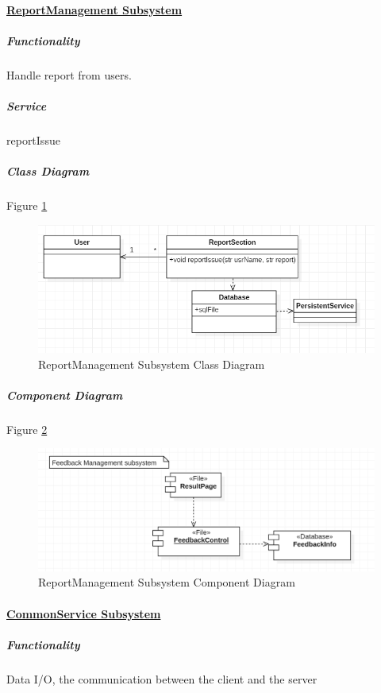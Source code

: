 \documentclass[10pt]{article}
\begin{document}
\paragraph{\underline{ReportManagement Subsystem}}
\subparagraph{Functionality} Handle report from users.

\subparagraph{Service}  reportIssue

\subparagraph{Class Diagram} Figure \ref{ReportManagement Subsystem Class Diagram}

\begin{figure}[H]
	\centering
	
	\includegraphics[width=14cm]{reportclass.png}
	\caption{ReportManagement Subsystem Class Diagram}
	\label{ReportManagement Subsystem Class Diagram}
\end{figure}

\subparagraph{Component Diagram} Figure \ref{ReportManagement Subsystem Component Diagram}

\begin{figure}[H]
	\centering
	
	\includegraphics[width=14cm]{reportcom.png}
	\caption{ReportManagement Subsystem Component Diagram}
	\label{ReportManagement Subsystem Component Diagram}
\end{figure}

\paragraph{\underline{CommonService  Subsystem}}
\subparagraph{Functionality} Data I/O, the communication between the client and the server
\end{document}

